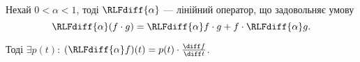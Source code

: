 \begin{theorem}[Тарасова]
    Нехай $0 < \alpha < 1$, тоді $\RLFdiff{\alpha}$ --- лінійний оператор, що задовольняє умову
    \begin{equation}
        \RLFdiff{\alpha}(f \cdot g) = \RLFdiff{\alpha} f \cdot g + f \cdot \RLFdiff{\alpha} g.
    \end{equation}
    
    Тоді $\exists p(t)$: $(\RLFdiff{\alpha} f) (t) = p(t) \cdot \frac{\diff f}{\diff t}$.
\end{theorem}
